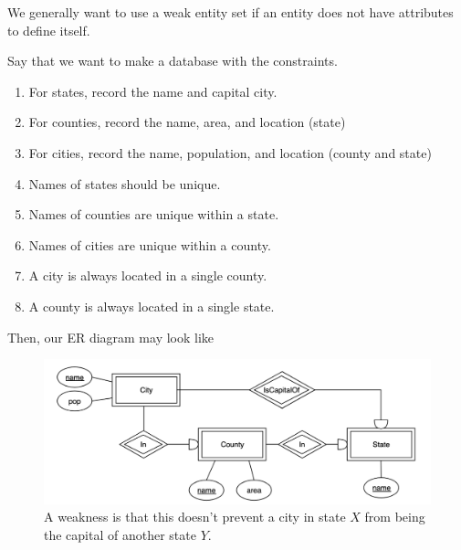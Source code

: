 \documentclass{article}
\begin{document}
    We generally want to use a weak entity set if an entity does not have attributes to define itself. 
    
    \begin{example}
      Say that we want to make a database with the constraints. 
      \begin{enumerate}
        \item For states, record the name and capital city. 
        \item For counties, record the name, area, and location (state) 
        \item For cities, record the name, population, and location (county and state) 
        \item Names of states should be unique. 
        \item Names of counties are unique within a state. 
        \item Names of cities are unique within a county. 
        \item A city is always located in a single county. 
        \item A county is always located in a single state. 
      \end{enumerate}
      Then, our ER diagram may look like 
      \begin{figure}[H]
        \centering 
        \includegraphics[scale=0.3]{img/city1.png}
        \caption{A weakness is that this doesn't prevent a city in state $X$ from being the capital of another state $Y$.} 
        \label{fig:city1}
      \end{figure}
    \end{example}
\end{document}
